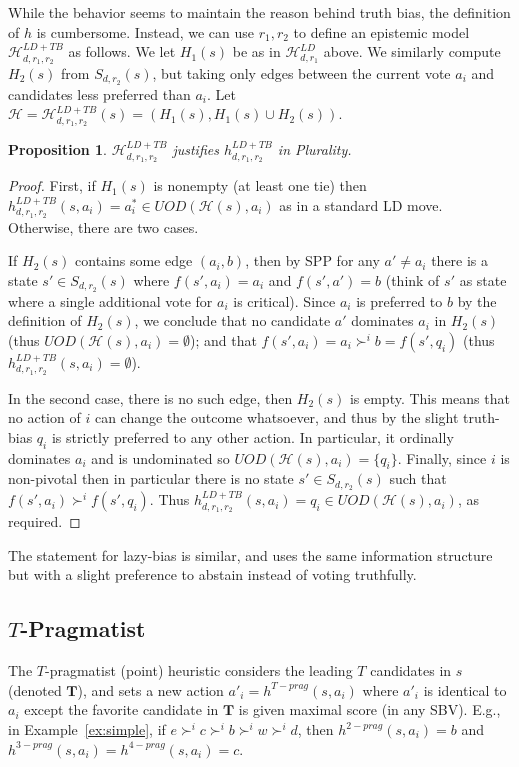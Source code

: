 \documentclass[letterpaper]{article} %
\def\calH{\mathcal{H}}
\newtheorem{proposition}[theorem]{Proposition}
\begin{document}
While the behavior seems to maintain the reason behind truth bias, the definition of $h$ is cumbersome. Instead, we can use $r_1,r_2$ to define an epistemic model $\calH^{LD+TB}_{d,r_1,r_2}$ as follows. We let $H_1(s)$ be as in $\calH^{LD}_{d,r_1}$ above. We similarly compute $H_{2}(s)$ from $S_{d,r_2}(s)$, but taking only edges between the current vote $a_i$ and candidates less preferred than $a_i$. Let $\calH = \calH^{LD+TB}_{d,r_1,r_2}(s) = (H_1(s),H_1(s) \cup H_2(s))$.
\begin{proposition} $\calH^{LD+TB}_{d,r_1,r_2}$ justifies $h^{LD+TB}_{d,r_1,r_2}$ in Plurality.
\end{proposition}
\begin{proof}
First, if $H_1(s)$ is nonempty (at least one tie) then $h^{LD+TB}_{d,r_1,r_2}(s,a_i)= a^*_i \in UOD(\calH(s),a_i)$ as in a standard LD move. Otherwise, there are two cases.

If $H_2(s)$ contains some edge $(a_i,b)$, then by SPP for any $a'\neq a_i$ there is a state $s'\in S_{d,r_2}(s)$ where $f(s',a_i)=a_i$ and $f(s',a')=b$ (think of $s'$ as state where a single additional vote for $a_i$ is critical). Since $a_{i}$ is preferred to $b$ by the definition of $H_{2}(s)$, we conclude that no candidate $a'$ dominates $a_i$ in $H_2(s)$ (thus $UOD(\calH(s),a_i)=\emptyset$); and that $f(s',a_i) =a_i \succ^i b= f(s',q_i)$ (thus $h^{LD+TB}_{d,r_1,r_2}(s,a_i)=\emptyset$).

In the second case, there is no such edge, then $H_2(s)$ is empty. This means that no action of $i$ can change the outcome whatsoever, and thus by the slight truth-bias $q_i$ is strictly preferred to any other action. In particular, it ordinally dominates $a_i$ and is undominated so $UOD(\calH(s),a_i) = \{q_i\}$.
Finally, since $i$ is non-pivotal then in particular there is no state $s'\in S_{d,r_2}(s)$ such that $f(s',a_i) \succ^i f(s',q_i)$. Thus $h^{LD+TB}_{d,r_1,r_2}(s,a_i)=q_i \in UOD(\calH(s),a_i)$, as required.
\end{proof}

The statement for lazy-bias is similar, and uses the same information structure but with a slight preference to abstain instead of voting truthfully.

\subsection{$T$-Pragmatist} The $T$-pragmatist (point) heuristic \cite{brams1978approval,RE12} considers the leading $T$ candidates in $s$ (denoted $\mathbf T$), and sets a new action $a'_i=h^{T-prag}(s,a_i)$ where $a'_i$ is identical to $a_i$ except the favorite candidate in $\mathbf T$ is given maximal score (in any SBV). E.g., in Example~\ref{ex:simple}, if $e\succ^i c\succ^i b \succ^i w \succ^i d$, then $h^{2\!-\!prag}(s,a_i)\!=\!b$ and $h^{3\!-\!prag}(s,a_i)\!=\!h^{4\!-\!prag}(s,a_i)\!=\!c$.
\end{document}
